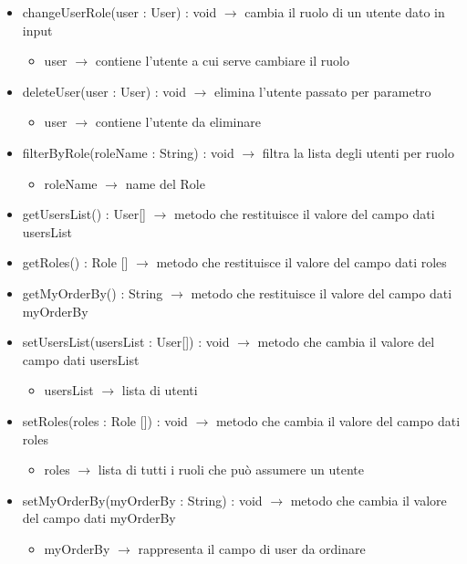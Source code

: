 \begin{description}
\begin{itemize}
	\item changeUserRole(user  : User) : void $\rightarrow$ cambia il ruolo di un utente dato in input\begin{itemize}
		\item user  $\rightarrow$ contiene l'utente a cui serve cambiare il ruolo
	\end{itemize}
	
	\item deleteUser(user  : User) : void $\rightarrow$ elimina l'utente passato per parametro\begin{itemize}
		\item user  $\rightarrow$ contiene l'utente da eliminare 
	\end{itemize}
	
	\item filterByRole(roleName : String) : void $\rightarrow$ filtra la lista degli utenti per ruolo\begin{itemize}
		\item roleName $\rightarrow$ name del Role
	\end{itemize}
	
	\item getUsersList() : User[] $\rightarrow$ metodo che restituisce il valore del campo dati usersList
	\item getRoles() : Role [] $\rightarrow$ metodo che restituisce il valore del campo dati roles
	\item getMyOrderBy() : String $\rightarrow$ metodo che restituisce il valore del campo dati myOrderBy
	\item setUsersList(usersList : User[]) : void $\rightarrow$ metodo che cambia il valore del campo dati usersList\begin{itemize}
		\item usersList $\rightarrow$ lista di utenti
	\end{itemize}
	
	\item setRoles(roles : Role []) : void $\rightarrow$ metodo che cambia il valore del campo dati roles\begin{itemize}
		\item roles $\rightarrow$ lista di tutti i ruoli che può assumere un utente
	\end{itemize}
	
	\item setMyOrderBy(myOrderBy : String) : void $\rightarrow$ metodo che cambia il valore del campo dati myOrderBy\begin{itemize}
		\item myOrderBy $\rightarrow$ rappresenta il campo di user da ordinare
	\end{itemize}
	
\end{itemize}

\end{description}

